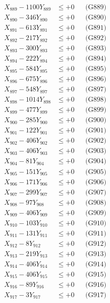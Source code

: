 \documentclass[a4paper,10pt]{article}
\begin{document}
{\begin{align}
X_{889} - 1100Y_{889} &\leq +0 && \text{(G889)} \\
X_{890} - 346Y_{890} &\leq +0 && \text{(G890)} \\
\allowbreak
X_{891} - 613Y_{891} &\leq +0 && \text{(G891)} \\
X_{892} - 217Y_{892} &\leq +0 && \text{(G892)} \\
X_{893} - 300Y_{893} &\leq +0 && \text{(G893)} \\
X_{894} - 222Y_{894} &\leq +0 && \text{(G894)} \\
X_{895} - 584Y_{895} &\leq +0 && \text{(G895)} \\
X_{896} - 675Y_{896} &\leq +0 && \text{(G896)} \\
X_{897} - 548Y_{897} &\leq +0 && \text{(G897)} \\
X_{898} - 1014Y_{898} &\leq +0 && \text{(G898)} \\
X_{899} - 477Y_{899} &\leq +0 && \text{(G899)} \\
X_{900} - 285Y_{900} &\leq +0 && \text{(G900)} \\
\allowbreak
X_{901} - 122Y_{901} &\leq +0 && \text{(G901)} \\
X_{902} - 406Y_{902} &\leq +0 && \text{(G902)} \\
X_{903} - 406Y_{903} &\leq +0 && \text{(G903)} \\
X_{904} - 81Y_{904} &\leq +0 && \text{(G904)} \\
X_{905} - 151Y_{905} &\leq +0 && \text{(G905)} \\
X_{906} - 171Y_{906} &\leq +0 && \text{(G906)} \\
X_{907} - 299Y_{907} &\leq +0 && \text{(G907)} \\
X_{908} - 97Y_{908} &\leq +0 && \text{(G908)} \\
X_{909} - 406Y_{909} &\leq +0 && \text{(G909)} \\
X_{910} - 103Y_{910} &\leq +0 && \text{(G910)} \\
\allowbreak
X_{911} - 131Y_{911} &\leq +0 && \text{(G911)} \\
X_{912} - 8Y_{912} &\leq +0 && \text{(G912)} \\
X_{913} - 219Y_{913} &\leq +0 && \text{(G913)} \\
X_{914} - 406Y_{914} &\leq +0 && \text{(G914)} \\
X_{915} - 406Y_{915} &\leq +0 && \text{(G915)} \\
X_{916} - 89Y_{916} &\leq +0 && \text{(G916)} \\
X_{917} - 3Y_{917} &\leq +0 && \text{(G917)} \\

\end{align}}
\end{document}
